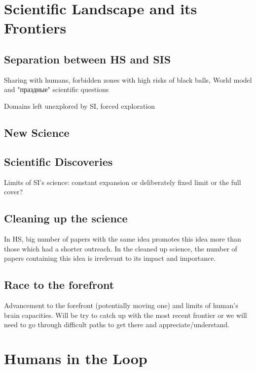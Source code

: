 \documentclass[a4paper,11pt]{article}
\begin{document}
    \section{Scientific Landscape and its Frontiers}

        \subsection{Separation between HS and SIS}

        Sharing with humans, forbidden zones with high risks of black balls, World model and "праздные" scientific questions

        Domains left unexplored by SI, forced exploration

        \subsection{New Science}

        \subsection{Scientific Discoveries}

        Limits of SI's science: constant expansion or deliberately fixed limit or the full cover?

        \subsection{Cleaning up the science}

        In HS, big number of papers with the same idea promotes this idea more than those which had a shorter outreach. In the cleaned up science, the number of papers containing this idea is irrelevant to its impact and importance. 

        \subsection{Race to the forefront}

        Advancement to the forefront (potentially moving one) and limits of human's brain capacities. Will be try to catch up with the most recent frontier or we will need to go through difficult paths to get there and appreciate/understand.

    \section{Humans in the Loop}
\end{document}
